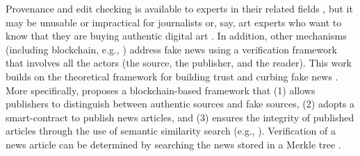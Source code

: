 Provenance and edit checking is available to experts in their related fields \cite{cooper10}, but it may be unusable or impractical for journalists or, say, art experts who want to know that they are buying authentic digital art \cite{wlwc21}. In addition, other mechanisms (including blockchain, e.g., \cite{qqjs19}) address fake news using a verification framework that involves all the actors (the source, the publisher, and the reader). This work builds on the theoretical framework for building trust and curbing fake news \cite{hw17, sllj18, jm19}. More specifically, \cite{qqjs19} proposes a blockchain-based framework that (1) allows publishers to distinguish between authentic sources and fake sources, (2) adopts a smart-contract \cite{smart-contract} to publish news articles, and (3) ensures the integrity of published articles through the use of semantic similarity search (e.g., \cite{sshash-1,sshash-2}). Verification of a news article can be determined by searching the news stored in a Merkle tree \cite{merkle-tree}.